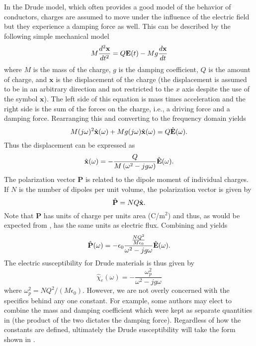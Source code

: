 In the Drude model, which often provides a good model of the behavior
of conductors, charges are assumed to move under the influence of the
electric field but they experience a damping force as well.  This can
be described by the following simple mechanical model
\begin{equation}
  M\frac{d^2\mathbf{x}}{dt^2} = Q\mathbf{E}(t) - Mg \frac{d\mathbf{x}}{dt}
  \label{eq:drudePhysical}
\end{equation}
where $M$ is the mass of the charge, $g$ is the damping coefficient,
$Q$ is the amount of charge, and $\mathbf{x}$ is the displacement of
the charge (the displacement is assumed to be in an arbitrary
direction and not restricted to the $x$ axis despite the use of the
symbol $\mathbf{x}$).  The left side of this equation is mass times
acceleration and the right side is the sum of the forces on the
charge, i.e., a driving force and a damping force.  Rearranging this
and converting to the frequency domain yields
\begin{equation}
  M(j\omega)^2\hat{\mathbf{x}}(\omega) + Mg
  (j\omega)\hat{\mathbf{x}}(\omega) = Q\hat{\mathbf{E}}(\omega).
\end{equation}
Thus the displacement can be expressed as
\begin{equation}
  \hat{\mathbf{x}}(\omega) = 
   -\frac{Q}{M\left(\omega^2 - jg\omega\right)}\hat{\mathbf{E}}(\omega).
   \label{eq:xVecDef}
\end{equation}
The polarization vector $\mathbf{P}$ is related to the dipole moment
of individual charges.  If $N$ is the number of dipoles per unit
volume, the polarization vector is given by
\begin{equation}
  \hat{\mathbf{P}} = NQ\hat{\mathbf{x}}.
  \label{eq:pVecDef}
\end{equation}
Note that $\mathbf{P}$ has units of charge per units area (C/m$^2$)
and thus, as would be expected from , has the same
units as electric flux.  Combining  and
 yields
\begin{equation}
  \hat{\mathbf{P}}(\omega) =
   - \epsilon_0\frac{\frac{NQ^2}{M\epsilon_0}}{\omega^2 - jg\omega}
     \hat{\mathbf{E}}(\omega).
\end{equation}
The electric susceptibility for Drude materials is thus given by
\begin{equation}
  \hat{\chi}_e(\omega) = - \frac{\omega^2_p}{\omega^2 - jg\omega}
  \label{eq:drudeChiOmega}
\end{equation}
where $\omega^2_p=NQ^2/(M\epsilon_0)$.  However, we are not overly
concerned with the specifics behind any one constant.  For example,
some authors may elect to combine the mass and damping coefficient
which were kept as separate quantities in 
(the product of the two dictates the damping force).  Regardless of
how the constants are defined, ultimately the Drude susceptibility
will take the form shown in .

